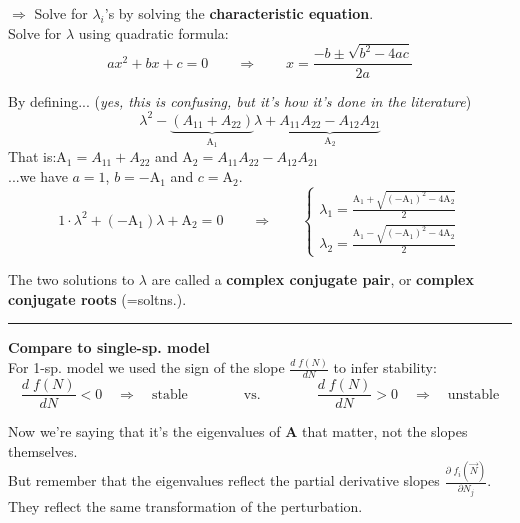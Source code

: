\documentclass{article}
\newcommand{\ind}{\-\hspace{1cm}}
\begin{document}
\ind $\Rightarrow$ Solve for $\lambda_i$'s by solving the \textbf{characteristic equation}.\\

Solve for $\lambda$ using quadratic formula:
\begin{equation*}
	a x^2 + bx + c = 0 \qquad  \Rightarrow  \qquad x = \frac{-b\pm \sqrt{b^2 - 4ac}}{2a}
\end{equation*}

By defining... \ind (\emph{yes, this is confusing, but it's how it's done in the literature})\\
\begin{equation*}
	\lambda^2 - \underbrace{(A_{11}+A_{22})}_{\text{A}_1}\lambda + \underbrace{A_{11}A_{22} - A_{12} A_{21}}_{\text{A}_2}
\end{equation*}
That is:\ind $\text{A}_1 = A_{11}+A_{22}$ and $\text{A}_2 = A_{11} A_{22} - A_{12} A_{21}$\\

...we have $a=1$, $b=-\text{A}_1$ and $c=\text{A}_2$.
\begin{equation*}
	1 \cdot \lambda^2 + (-\text{A}_1)\lambda + \text{A}_2 = 0 \qquad  \Rightarrow  \qquad  
	 \begin{cases} 
	\lambda_1 = \frac{\text{A}_1 + \sqrt{(-\text{A}_1)^2 - 4\text{A}_2}}{2} \\
	\lambda_2 = \frac{\text{A}_1 - \sqrt{(-\text{A}_1)^2 - 4\text{A}_2}}{2}
	\end{cases}
\end{equation*}

The two solutions to $\lambda$ are called a \textbf{complex conjugate pair}, or  \textbf{complex conjugate roots} (=soltns.).

\rule[0.5ex]{\linewidth}{1pt}
 
\textbf{Compare to single-sp. model}\\
For 1-sp. model we used the sign of the slope $\frac{d \; f(N)}{dN}$ to infer stability:
\begin{equation*}
	\frac{d \; f(N)}{dN} < 0 \quad \Rightarrow \quad \text{stable} \qquad \qquad \text{vs.}\qquad \qquad
	\frac{d \; f(N)}{dN} > 0 \quad \Rightarrow \quad \text{unstable}
\end{equation*}

Now we're saying that it's the eigenvalues of $\mathbf{A}$ that matter, not the slopes themselves.\\
But remember that the eigenvalues reflect the partial derivative slopes $\frac{\partial \; f_i(\vec{N})}{\partial N_j}$. \\
\ind They reflect the same transformation of the perturbation.\\
\end{document}
